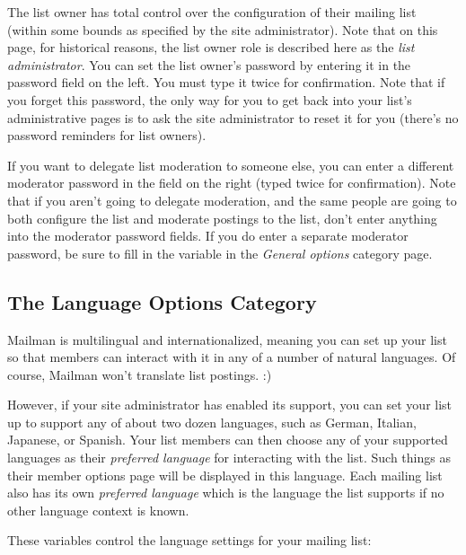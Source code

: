 \documentclass{howto}
\begin{document}
The list owner has total control over the configuration of their
mailing list (within some bounds as specified by the site
administrator).  Note that on this page, for historical reasons, the
list owner role is described here as the \emph{list administrator}.
You can set the list owner's password by entering it in the password
field on the left.  You must type it twice for confirmation.  Note
that if you forget this password, the only way for you to get back
into your list's administrative pages is to ask the site administrator
to reset it for you (there's no password reminders for list owners).

If you want to delegate list moderation to someone else, you can enter
a different moderator password in the field on the right (typed twice
for confirmation).  Note that if you aren't going to delegate
moderation, and the same people are going to both configure the list
and moderate postings to the list, don't enter anything into the
moderator password fields.  If you do enter a separate moderator
password, be sure to fill in the  variable in the
\emph{General options} category page. 

\subsection{The Language Options Category}
Mailman is multilingual and internationalized, meaning you can set up
your list so that members can interact with it in any of a number of
natural languages.  Of course, Mailman won't translate list
postings. :)

However, if your site administrator has enabled its support, you can
set your list up to support any of about two dozen languages, such as
German, Italian, Japanese, or Spanish.  Your list members can then
choose any of your supported languages as their \emph{preferred
language} for interacting with the list.  Such things as their member
options page will be displayed in this language.  Each mailing list
also has its own \emph{preferred language} which is the language the
list supports if no other language context is known.

These variables control the language settings for your mailing list:
\end{document}
